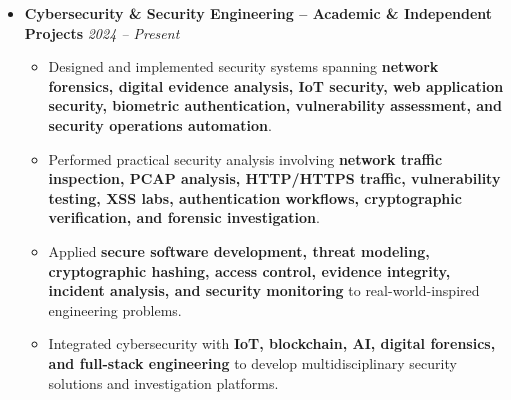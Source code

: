 \documentclass[a4paper,11pt]{article}
\newcommand{\resumeItem}[1]{
    \item \small{#1 \vspace{-2pt}}
}
\begin{document}
\begin{itemize}[leftmargin=0in, label={}]
\begin{itemize}[leftmargin=*]

\resumeItem{Selected for the \textbf{National Internship Program 2026 with SmartBridge}, gaining hands-on exposure to enterprise application development and workflow automation using the \textbf{Pega Platform}.}

\resumeItem{Developing practical knowledge of \textbf{Business Process Management (BPM), Case Management, Digital Process Automation (DPA), enterprise workflows, application configuration, and data integration}.}

\resumeItem{Applying structured enterprise software practices involving \textbf{application lifecycle management, business process modeling, case lifecycle design, workflow orchestration, and secure enterprise application development}.}

\end{itemize}

\vspace{4pt}

\item
\textbf{Cybersecurity \& Security Engineering -- Academic \& Independent Projects}
\hfill \textit{2024 -- Present}

\begin{itemize}[leftmargin=*]

\resumeItem{Designed and implemented security systems spanning \textbf{network forensics, digital evidence analysis, IoT security, web application security, biometric authentication, vulnerability assessment, and security operations automation}.}

\resumeItem{Performed practical security analysis involving \textbf{network traffic inspection, PCAP analysis, HTTP/HTTPS traffic, vulnerability testing, XSS labs, authentication workflows, cryptographic verification, and forensic investigation}.}

\resumeItem{Applied \textbf{secure software development, threat modeling, cryptographic hashing, access control, evidence integrity, incident analysis, and security monitoring} to real-world-inspired engineering problems.}

\resumeItem{Integrated cybersecurity with \textbf{IoT, blockchain, AI, digital forensics, and full-stack engineering} to develop multidisciplinary security solutions and investigation platforms.}

\end{itemize}

\end{itemize}
\end{document}
